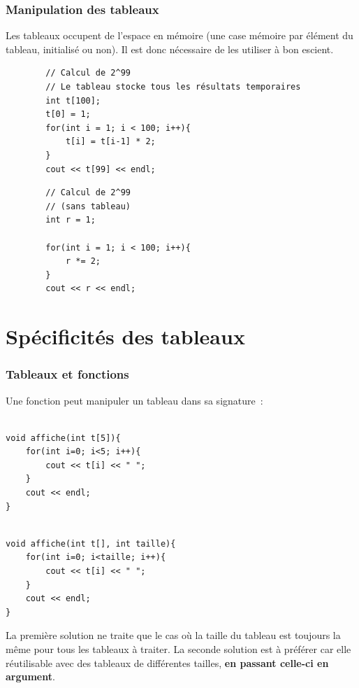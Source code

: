 \begin{frame}[fragile]
	\frametitle{Manipulation des tableaux}
	Les tableaux occupent de l'espace en mémoire (une case mémoire par élément du tableau, initialisé ou non). Il est donc nécessaire de les utiliser à bon escient.
	
    \begin{minipage}{0.49\linewidth}
        \begin{verbatim}
        // Calcul de 2^99
        // Le tableau stocke tous les résultats temporaires
        int t[100];
        t[0] = 1;
        for(int i = 1; i < 100; i++){
            t[i] = t[i-1] * 2;
        }
        cout << t[99] << endl;
        \end{verbatim}
    \end{minipage}
    \begin{minipage}{0.49\linewidth}
        \begin{verbatim}
        // Calcul de 2^99
        // (sans tableau)
        int r = 1;
        
        for(int i = 1; i < 100; i++){
            r *= 2;
        }
        cout << r << endl;
        \end{verbatim}
    \end{minipage}
\end{frame}

\section{Spécificités des tableaux}

\begin{frame}[fragile]
\frametitle{Tableaux et fonctions}

Une fonction peut manipuler un tableau dans sa signature~:

\begin{minipage}{0.47\linewidth}
\begin{verbatim}

void affiche(int t[5]){
    for(int i=0; i<5; i++){
    	cout << t[i] << " ";
    }
    cout << endl;
}

\end{verbatim}
\end{minipage}
\hfill
\begin{minipage}{0.52\linewidth}
\begin{verbatim}

void affiche(int t[], int taille){
    for(int i=0; i<taille; i++){
    	cout << t[i] << " ";
    }
    cout << endl;
}

\end{verbatim}
\end{minipage}

\vspace{0.3cm}
La première solution ne traite que le cas où la taille du tableau est toujours la même pour tous les tableaux à traiter. La seconde solution est à préférer car elle réutilisable avec des tableaux de différentes tailles, \textbf{en passant celle-ci en argument}.
\end{frame}

